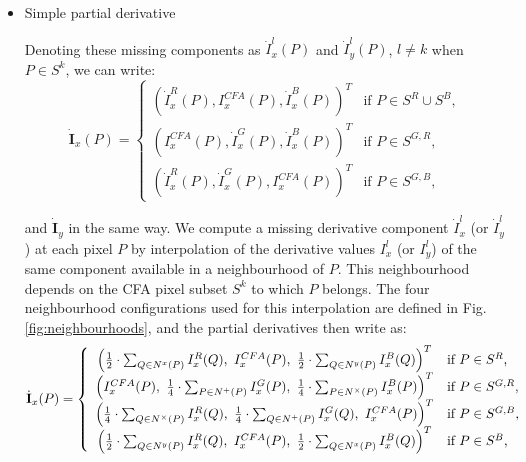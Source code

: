 \documentclass[twoside]{article}
\newcommand\point{\stackrel{.}}
\begin{document}
\begin{itemize}
	\item Simple partial derivative

		
		Denoting these missing components as $\dot{I}_x^l(P)$ and $\dot{I}_y^l(P)$, $l \neq k$ when $P \in S^k$, we can write:
		\begin{equation}
			\dot{\textbf{I}}_x(P) = \left\lbrace
			\begin{array}{cl}
				\left( \dot{I}^R_x(P), I^{CFA}_x(P), \dot{I}^B_x(P) \right)^T & \text{if $P \in S^R \cup S^B$,}\\
				\left( I^{CFA}_x(P), \dot{I}^G_x(P), \dot{I}^B_x(P) \right)^T & \text{if $P \in S^{G,R}$,}\\
				\left( \dot{I}^R_x(P), \dot{I}^G_x(P), I^{CFA}_x(P) \right)^T & \text{if $P \in S^{G,B}$,}
			\end{array}\right.
			\label{eq:I_p_x}
		\end{equation}
		
		\noindent and $\dot{\textbf{I}}_y$ in the same way. We compute a missing derivative component $\dot{I}_{x}^l$ (or $\dot{I}_{y}^l$) at each pixel $P$ by interpolation of the derivative values $I_{x}^l$ (or $I_{y}^l$) of the same component available in a neighbourhood of $P$. This neighbourhood depends on the CFA pixel subset $S^k$ to which $P$ belongs. The four neighbourhood configurations used for this interpolation are defined in Fig. \ref{fig:neighbourhoods}, and the partial derivatives then write as:
		\begin{equation}
			\dot{\textbf{I}}_x(P) = \left\lbrace
			\begin{array}{cl}
				\left( \frac{1}{2}\cdot\sum_{Q \in N^{x}(P)} I^R_x(Q),~I^{CFA}_x(P),~\frac{1}{2}\cdot\sum_{Q \in N^{y}(P)} I^B_x(Q) \right)^T & \text{if $P \in S^R$,} \\
				\left( I^{CFA}_x(P),~\frac{1}{4}\cdot\sum_{P \in N^{+}(P)} I^G_x(P),~\frac{1}{4}\cdot\sum_{P \in N^{\times}(P)} I^B_x(P) \right)^T & \text{if $P \in S^{G,R}$,}\\
				\left( \frac{1}{4}\cdot\sum_{Q \in N^{\times}(P)} I^R_x(Q),~\frac{1}{4}\cdot\sum_{Q \in N^{+}(P)} I^G_x(Q),~I^{CFA}_x(P) \right)^T & \text{if $P \in S^{G,B}$,}\\
				\left( \frac{1}{2}\cdot\sum_{Q \in N^{y}(P)} I^R_x(Q),~I^{CFA}_x(P),~\frac{1}{2}\cdot\sum_{Q \in N^{x}(P)} I^B_x(Q) \right)^T & \text{if $P \in S^B$,}
			\end{array}\right.
			\label{eq:I_p_x_full}
		\end{equation}
		

\end{itemize}
\end{document}
